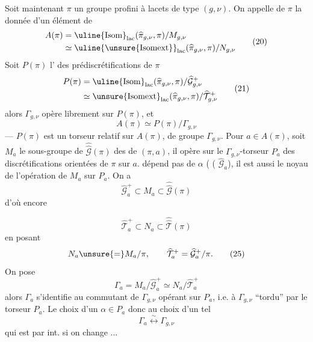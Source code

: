 Soit maintenant $\pi$ un groupe profini à lacets de type $(g,\nu)$. On appelle \uline{} de $\pi$ la donnée d'un élément de
\[
\begin{aligned}
 A(\pi)&=\uline{\mathrm{Isom}}_{\mathrm{lac}}(\widehat{\pi}_{g,\nu},\pi)/M_{g,\nu}\\
 &\simeq\uline{\unsure{\mathrm{Isomext}}}_{\mathrm{lac}}(\widehat{\pi}_{g,\nu},\pi)/N_{g,\nu}
\end{aligned}
\tag{20}
\]
Soit $P(\pi)$ l' des prédiscrétifications  de $\pi$
\[
\begin{aligned}
 P(\pi)&=\uline{\mathrm{Isom}}_{\mathrm{lac}}(\widehat{\pi}_{g,\nu},\pi)/\widehat{\mathcal G}_{g,\nu}^{+}\\
 &\simeq\unsure{\mathrm{Isomext}}_{\mathrm{lac}}(\widehat{\pi}_{g,\nu},\pi)/\widehat{\mathcal T}_{g,\nu}^{+}
\end{aligned}
\tag{21}
\]
alors $\Gamma_{g,\nu}$ opère librement  sur $P(\pi)$, et
\[
 A(\pi)\simeq P(\pi)/\Gamma_{g,\nu}
\tag{22}
\]
--- $P(\pi)$ est un torseur relatif sur $A(\pi)$, de groupe $\Gamma_{g,\nu}$. Pour $a\in A(\pi)$, soit $M_a$ le sous-groupe de $\widehat{\widehat{\mathcal G}}(\pi)$ des  de $(\pi,a)$, il opère sur le $\Gamma_{g,\nu}$-torseur $P_a$ des discrétifications orientées de $\pi$ sur $a$.
 dépend pas de $\alpha$ ( ( $\widehat{\mathcal G}_a$), il est aussi le noyau de l'opération de $M_a$ sur $P_a$. On a
\[
 \widehat{\mathcal G}_a^{+}\subset M_a\subset\widehat{\widehat{\mathcal G}}(\pi)
\tag{23}
\]
d'où encore


\[
 \widehat{\mathcal T}_a^{+}\subset N_a\subset\widehat{\widehat{\mathcal T}}(\pi)
\tag{24}
\]
en posant
\[
 N_a\unsure{=}M_a/\pi,\qquad
 \widehat{\mathcal T}_a^{+}=\widehat{\mathcal G}_a^{+}/\pi.
\tag{25}
\]
On pose
\[
 \Gamma_a=M_a/\widehat{\mathcal G}_a^{+}\simeq N_a/\widehat{\mathcal T}_a^{+}
\tag{26}
\]
alors $\Gamma_a$ s'identifie au commutant de $\Gamma_{g,\nu}$ opérant sur $P_a$, i.e. à $\Gamma_{g,\nu}$ ``tordu'' par le torseur $P_a$. Le choix d'un $\alpha\in P_a$  donc au choix d'un tel 
\[
 \Gamma_a\overset{\sim}{\longleftrightarrow}\Gamma_{g,\nu}
\tag{27}
\]
qui est  par  int. si on change ...

